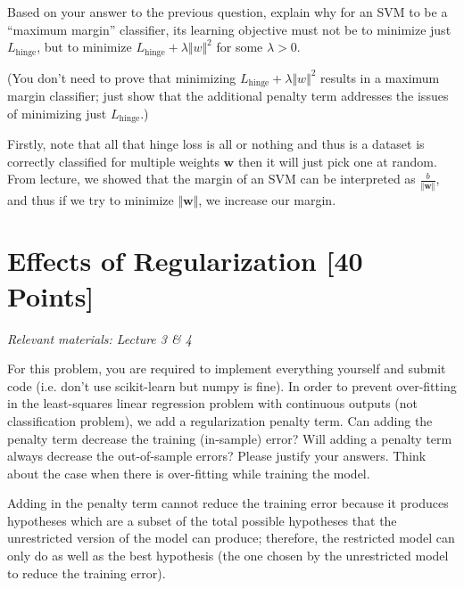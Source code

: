 \problem[5]
Based on your answer to the previous question, explain why for an SVM to be a ``maximum margin'' classifier, its learning objective must not be to minimize just $L_\text{hinge}$, but to minimize $L_\text{hinge} + \lambda\Vert w \Vert^2$ for some $\lambda > 0$.

(You don't need to prove that minimizing $L_\text{hinge} + \lambda\Vert w \Vert^2$ results in a maximum margin classifier; just show that the additional penalty term addresses the issues of minimizing just $L_\text{hinge}$.)

\begin{solution}
  Firstly, note that all that hinge loss is all or nothing and thus is a dataset is correctly classified for multiple weights $\mathbf{w}$ then it will just pick one at random. From lecture, we showed that the margin of an SVM can be interpreted as $\frac{b}{\Vert\mathbf{w}\Vert}$, and thus if we try to minimize $\Vert\mathbf{w}\Vert$, we increase our margin.
\end{solution}


\newpage
\section{Effects of Regularization [40 Points]}
\textit{Relevant materials: Lecture 3 \& 4}

For this problem, you are required to implement everything yourself and submit code (i.e. don't use scikit-learn but numpy is fine).
\indent\problem[4] 
In order to prevent over-fitting in the least-squares linear regression problem with continuous outputs (not classification problem), we add a regularization penalty term.
Can adding the penalty term decrease the training (in-sample) error?
Will adding a penalty term always decrease the out-of-sample errors?
Please justify your answers. Think about the case when there is over-fitting while training the model.

\begin{solution}
  Adding in the penalty term cannot reduce the training error because it produces hypotheses which are a subset of the total possible hypotheses that the unrestricted version of the model can produce; therefore, the restricted model can only do as well as the best hypothesis (the one chosen by the unrestricted model to reduce the training error).
\end{solution}

